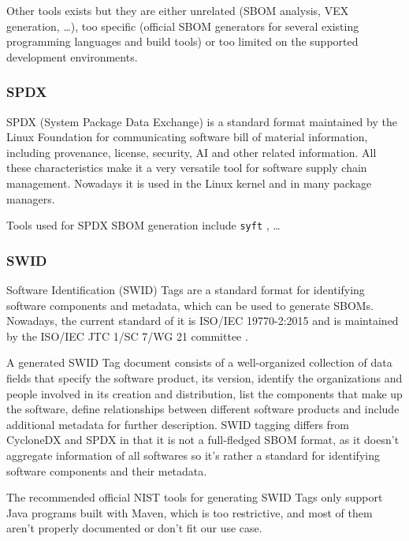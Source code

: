 Other tools exists but they are either unrelated (SBOM analysis, VEX generation, \dots), too specific (official SBOM generators for several existing programming languages and build tools) or too limited on the supported development environments.

\subsubsection{SPDX} \label{methodology:standard:spdx}

SPDX (System Package Data Exchange) \cite{standards:sbom:spdx} is a standard format maintained by the Linux Foundation for communicating software bill of material information, including provenance, license, security, AI and other related information.
All these characteristics make it a very versatile tool for software supply chain management. Nowadays it is used in the Linux kernel and in many package managers.

Tools used for SPDX SBOM generation include \verb|syft| \cite{repository:cyclonedx:syft}, \dots

\subsubsection{SWID} \label{methodology:standard:swid}

Software Identification (SWID) Tags \cite{standards:sbom:swid} are a standard format for identifying software components and metadata, which can be used to generate SBOMs. Nowadays, the current standard of it is ISO/IEC 19770-2:2015 \cite{standards:swid:iso19770-2:2015} and is maintained by the ISO/IEC JTC 1/SC 7/WG 21 committee \cite{standards:swid:committee}.

A generated SWID Tag document consists of a well-organized collection of data fields that specify the software product, its version, identify the organizations and people involved in its creation and distribution, list the components that make up the software, define relationships between different software products and include additional metadata for further description.
SWID tagging differs from CycloneDX and SPDX in that it is not a full-fledged SBOM format, as it doesn't aggregate information of all softwares so it's rather a standard for identifying software components and their metadata.

The recommended official NIST tools for generating SWID Tags only support Java programs built with Maven, which is too restrictive, and most of them aren't properly documented or don't fit our use case.


